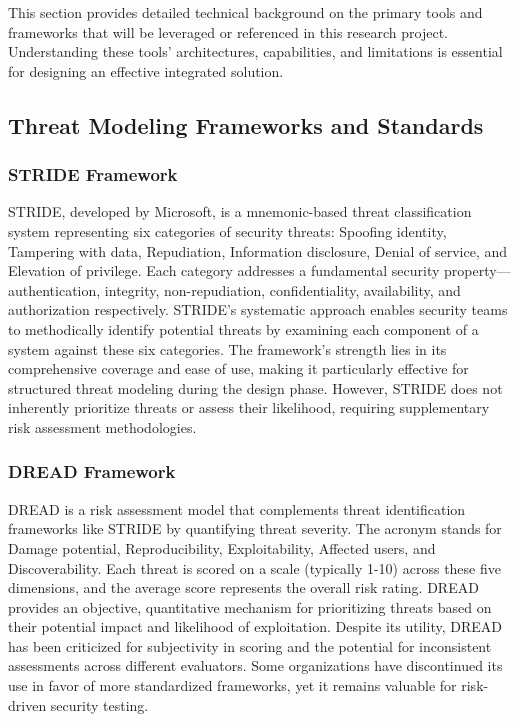 This section provides detailed technical background on the primary tools and frameworks that will be leveraged or referenced in this research project. Understanding these tools' architectures, capabilities, and limitations is essential for designing an effective integrated solution.

\subsection{Threat Modeling Frameworks and Standards}

\subsubsection{STRIDE Framework}
STRIDE, developed by Microsoft, is a mnemonic-based threat classification system representing six categories of security threats: Spoofing identity, Tampering with data, Repudiation, Information disclosure, Denial of service, and Elevation of privilege. Each category addresses a fundamental security property---authentication, integrity, non-repudiation, confidentiality, availability, and authorization respectively. STRIDE's systematic approach enables security teams to methodically identify potential threats by examining each component of a system against these six categories. The framework's strength lies in its comprehensive coverage and ease of use, making it particularly effective for structured threat modeling during the design phase. However, STRIDE does not inherently prioritize threats or assess their likelihood, requiring supplementary risk assessment methodologies.

\subsubsection{DREAD Framework}
DREAD is a risk assessment model that complements threat identification frameworks like STRIDE by quantifying threat severity. The acronym stands for Damage potential, Reproducibility, Exploitability, Affected users, and Discoverability. Each threat is scored on a scale (typically 1-10) across these five dimensions, and the average score represents the overall risk rating. DREAD provides an objective, quantitative mechanism for prioritizing threats based on their potential impact and likelihood of exploitation. Despite its utility, DREAD has been criticized for subjectivity in scoring and the potential for inconsistent assessments across different evaluators. Some organizations have discontinued its use in favor of more standardized frameworks, yet it remains valuable for risk-driven security testing.

